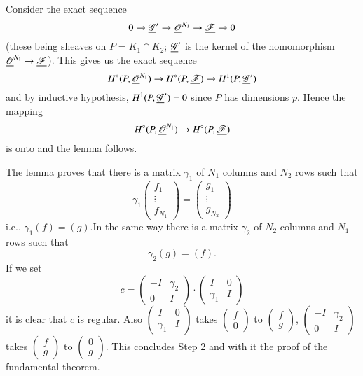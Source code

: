 \medskip
{}
Consider the exact sequence
$$
0 \to \underline{\mathscr{G}}' \to \underline{\mathscr{O}}^{N_1} \to \underline{\mathscr{F}}
\to 0
$$
(these being sheaves on $P= K_1 \cap K_2$; $\underline{\mathscr{G}}'$ is the
kernel of the homomorphism $\underline{\mathscr{O}}^{N_1} \to
\underline{\mathscr{F}}$). This gives us the exact sequence
$$
H^\circ (P, \underline{\mathscr{O}}^{N_1})\to H^\circ (P, \underline{\mathscr{F}}) \to
H^1 (P, \underline{\mathscr{G}}')
$$
and by inductive hypothesis, $H^1 (P, \underline{\mathscr{G}}') =0$ since $P$
has dimensions $p$. Hence the mapping 
$$
H^\circ (P, \underline{\mathscr{O}}^{N_1}) \to H^\circ (P, \underline{\mathscr{F}})
$$
is onto and the lemma follows. 


\medskip
{} The lemma proves that there is
a matrix $\gamma_1$ of $N_1$ columns and $N_2$ rows such that 
$$
\gamma_1 \begin{pmatrix}
f_1\\\vdots \\ f_{N_1} 
\end{pmatrix} 
= 
\begin{pmatrix}
g_1\\\vdots \\ g_{N_2}
\end{pmatrix}
$$
i.e., $\gamma_1(f) = (g)$.\pageoriginale In the same way there is a
matrix $\gamma_2$ of $N_2$ columns and $N_1$ rows such that
$$
\gamma_2 (g) = (f).
$$
If we set 
$$
c = \begin{pmatrix}
-I & \gamma_2\\
0 & I
\end{pmatrix} \cdot
\begin{pmatrix}
I & 0\\
\gamma_1 & I
\end{pmatrix}
$$
it is clear that $c$ is regular. Also $\begin{pmatrix}
I & 0\\ \gamma_1 & I\end{pmatrix}$ takes $\begin{pmatrix}
f\\0
\end{pmatrix}$ to $\begin{pmatrix}
f\\g\end{pmatrix}$, $\begin{pmatrix}
-I & \gamma_2 \\0 & I\end{pmatrix}$ takes $\begin{pmatrix}
f \\g
\end{pmatrix}$ to $\begin{pmatrix}
0 \\g
\end{pmatrix}$. This concludes Step 2 and with it the proof of the
fundamental theorem.

